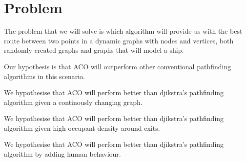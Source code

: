 \chapter{Problem}
\label{ch:problem}


The problem that we will solve is which algorithm will provide us with the best route between 
two points in a dynamic graphs with nodes and vertices, both randomly created graphs and 
graphs that will model a ship.

Our hypothesis is that ACO will outperform other conventional pathfinding algorithms
in this scenario. %

We hypothesise that ACO will perform better than djikstra's pathfinding algorithm
given a continously changing graph.

We hypothesise that ACO will perform better than djikstra's pathfinding algorithm
given high occupant density around exits.

We hypothesise that ACO will perform better than djikstra's pathfinding algorithm
by adding human behaviour.


